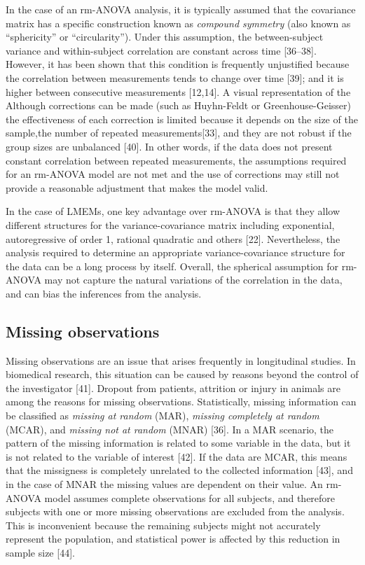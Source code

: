 \documentclass[
]{article}
\begin{document}
In the case of an rm-ANOVA analysis, it is typically assumed that the covariance matrix has a specific construction known as \emph{compound symmetry} (also known as ``sphericity'' or ``circularity''). Under this assumption, the between-subject variance and within-subject correlation are constant across time {[}36--38{]}. However, it has been shown that this condition is frequently unjustified because the correlation between measurements tends to change over time {[}39{]}; and it is higher between consecutive measurements {[}12,14{]}. A visual representation of the
Although corrections can be made (such as Huyhn-Feldt or Greenhouse-Geisser) the effectiveness of each correction is limited because it depends on the size of the sample,the number of repeated measurements{[}33{]}, and they are not robust if the group sizes are unbalanced {[}40{]}. In other words, if the data does not present constant correlation between repeated measurements, the assumptions required for an rm-ANOVA model are not met and the use of corrections may still not provide a reasonable adjustment that makes the model valid.

In the case of LMEMs, one key advantage over rm-ANOVA is that they allow different structures for the variance-covariance matrix including exponential, autoregressive of order 1, rational quadratic and others {[}22{]}. Nevertheless, the analysis required to determine an appropriate variance-covariance structure for the data can be a long process by itself. Overall, the spherical assumption for rm-ANOVA may not capture the natural variations of the correlation in the data, and can bias the inferences from the analysis.

\hypertarget{missing-observations}{%
\subsection{Missing observations}\label{missing-observations}}

Missing observations are an issue that arises frequently in longitudinal studies. In biomedical research, this situation can be caused by reasons beyond the control of the investigator {[}41{]}. Dropout from patients, attrition or injury in animals are among the reasons for missing observations. Statistically, missing information can be classified as \emph{missing at random} (MAR), \emph{missing completely at random} (MCAR), and \emph{missing not at random} (MNAR) {[}36{]}. In a MAR scenario, the pattern of the missing information is related to some variable in the data, but it is not related to the variable of interest {[}42{]}. If the data are MCAR, this means that the missigness is completely unrelated to the collected information {[}43{]}, and in the case of MNAR the missing values are dependent on their value. An rm-ANOVA model assumes complete observations for all subjects, and therefore subjects with one or more missing observations are excluded from the analysis. This is inconvenient because the remaining subjects might not accurately represent the population, and statistical power is affected by this reduction in sample size {[}44{]}.
\end{document}
